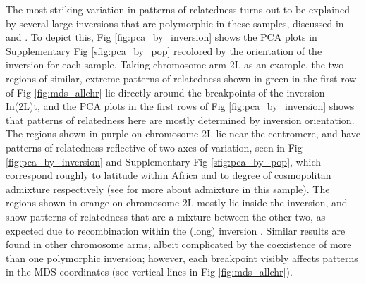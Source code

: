 \documentclass[11pt, oneside]{article}   	%
\newcommand\citet{\cite}
\newcommand\citep{\cite}
\newcommand{\Figure}{Fig }
\newcommand{\Figure}{{Figure }}
\newcommand{\plr}[1]{{\em \color{blue} #1}}
\begin{document}
The most striking variation in patterns of relatedness turns out to be explained by
several large inversions that are polymorphic in these samples, 
discussed in \citet{corbett2012population} and \citet{langley2012genomic}.
To depict this, \Figure \ref{fig:pca_by_inversion} shows
the PCA plots in Supplementary \Figure \ref{sfig:pca_by_pop} recolored by the orientation of the inversion for each sample.
Taking chromosome arm 2L as an example,
the two regions of similar, extreme patterns of relatedness
shown in green in the first row of \Figure \ref{fig:mds_allchr}
lie directly around the breakpoints of the inversion In(2L)t,
and the PCA plots in the first rows of \Figure \ref{fig:pca_by_inversion}
shows that patterns of relatedness here are mostly determined by inversion orientation.
The regions shown in purple on chromosome 2L lie near the centromere,
and have patterns of relatedness reflective of two axes of variation,
seen in \Figure \ref{fig:pca_by_inversion} and Supplementary \Figure \ref{sfig:pca_by_pop},
which correspond roughly to latitude within Africa and to degree of cosmopolitan admixture respectively
(see \citet{lack2015drosophila} for more about admixture in this sample).
The regions shown in orange on chromosome 2L mostly lie inside the inversion,
and show patterns of relatedness that are a mixture between the other two,
as expected due to recombination within the (long) inversion \citep{guerrero2011coalescent}.
Similar results are found in other chromosome arms,
albeit complicated by the coexistence of more than one polymorphic inversion;
however, each breakpoint visibly affects patterns in the MDS coordinates
(see vertical lines in \Figure \ref{fig:mds_allchr}).

\end{document}
